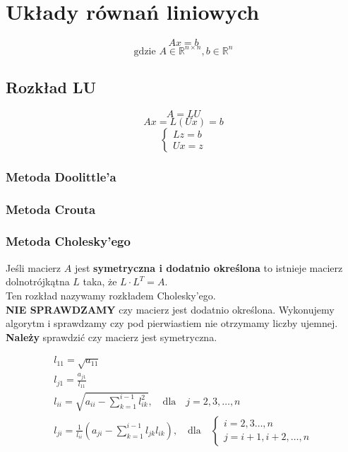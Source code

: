 \documentclass[../mn-notatki.tex]{subfiles}
\begin{document}
\section{Układy równań liniowych}

\begin{tcolorbox}
\[
Ax = b
\]
\[
\text{gdzie } A \in \mathbb{R}^{n \times n}, b \in \mathbb{R}^n
\]
\end{tcolorbox}

\subsection{Rozkład LU}

\begin{tcolorbox}
\[
A = LU
\]
\[
Ax = L(Ux) = b
\]
\[
\begin{cases}
Lz = b\\
Ux = z
\end{cases}
\]
\end{tcolorbox}

\subsubsection{Metoda Doolittle'a}
\subsubsection{Metoda Crouta}
\subsubsection{Metoda Cholesky'ego}

\begin{tcolorbox}
Jeśli macierz $A$ jest \textbf{symetryczna i dodatnio określona} to istnieje
macierz dolnotrójkątna $L$ taka, że $L\cdot L^T = A$.\\
Ten rozkład nazywamy rozkładem Cholesky'ego.\\

\textbf{NIE SPRAWDZAMY} czy macierz jest dodatnio określona. Wykonujemy
algorytm i sprawdzamy czy pod pierwiastiem nie otrzymamy liczby ujemnej.\\
\textbf{Należy} sprawdzić czy macierz jest symetryczna.
\end{tcolorbox}
\begin{gather*}
l_{11} = \sqrt{a_{11}}\\
l_{j1} = \frac{a_{j1}}{l_{11}}\\
l_{ii} = \sqrt{a_{ii} - \sum_{k=1}^{i-1} l_{ik}^2}, \text{~~ dla ~~} j = 2, 3, \ldots, n\\
l_{ji} = \frac{1}{l_{ii}} \left( a_{ji} - \sum_{k=1}^{i-1} l_{jk} l_{ik} \right),
\text{~~ dla ~~}
\begin{cases}
i = 2,3 \ldots, n\\
j = i +1, i+2, \ldots, n
\end{cases}
\end{gather*}
\end{document}

